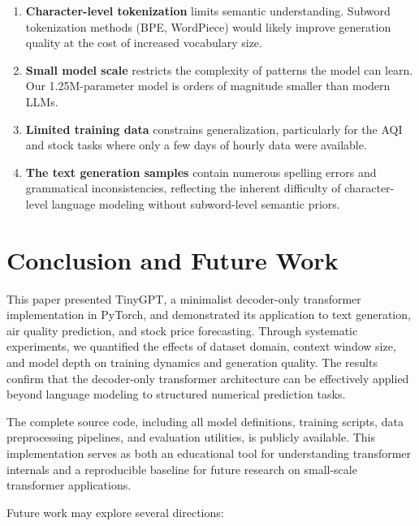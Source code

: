 \documentclass[conference]{IEEEtran}
\begin{document}
\begin{enumerate}
    \item \textbf{Character-level tokenization} limits semantic understanding. Subword tokenization methods (BPE, WordPiece) would likely improve generation quality at the cost of increased vocabulary size.
    \item \textbf{Small model scale} restricts the complexity of patterns the model can learn. Our 1.25M-parameter model is orders of magnitude smaller than modern LLMs.
    \item \textbf{Limited training data} constrains generalization, particularly for the AQI and stock tasks where only a few days of hourly data were available.
    \item \textbf{The text generation samples} contain numerous spelling errors and grammatical inconsistencies, reflecting the inherent difficulty of character-level language modeling without subword-level semantic priors.
\end{enumerate}

\section{Conclusion and Future Work}
\label{sec:conclusion}

This paper presented TinyGPT, a minimalist decoder-only transformer implementation in PyTorch, and demonstrated its application to text generation, air quality prediction, and stock price forecasting. Through systematic experiments, we quantified the effects of dataset domain, context window size, and model depth on training dynamics and generation quality. The results confirm that the decoder-only transformer architecture can be effectively applied beyond language modeling to structured numerical prediction tasks.

The complete source code, including all model definitions, training scripts, data preprocessing pipelines, and evaluation utilities, is publicly available. This implementation serves as both an educational tool for understanding transformer internals and a reproducible baseline for future research on small-scale transformer applications.

Future work may explore several directions:
\end{document}

